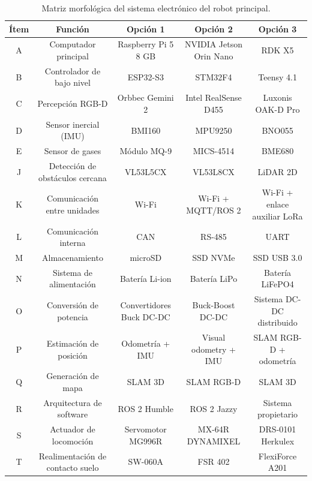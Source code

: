 \begin{table}[htbp]
\centering
\small
\renewcommand{\arraystretch}{1.3} %
\setlength{\tabcolsep}{5pt}       %

\begin{tabularx}{\textwidth}{|c|C|C|C|C|}
\hline
\textbf{Ítem} & \textbf{Función} & \textbf{Opción 1} & \textbf{Opción 2} & \textbf{Opción 3} \\
\hline
A & Computador principal & Raspberry Pi 5 8 GB & NVIDIA Jetson Orin Nano & RDK X5 \\
\hline
B & Controlador de bajo nivel & ESP32-S3 & STM32F4 & Teensy 4.1 \\
\hline
C & Percepción RGB-D & Orbbec Gemini 2 & Intel RealSense D455 & Luxonis OAK-D Pro \\
\hline
D & Sensor inercial (IMU) & BMI160 & MPU9250 & BNO055 \\
\hline
E & Sensor de gases & Módulo MQ-9 & MICS-4514 & BME680 \\
\hline
J & Detección de obstáculos cercana & VL53L5CX & VL53L8CX & LiDAR 2D \\
\hline
K & Comunicación entre unidades & Wi-Fi & Wi-Fi + MQTT/ROS 2 & Wi-Fi + enlace auxiliar LoRa \\
\hline
L & Comunicación interna & CAN & RS-485 & UART \\
\hline
M & Almacenamiento & microSD & SSD NVMe & SSD USB 3.0 \\
\hline
N & Sistema de alimentación & Batería Li-ion & Batería LiPo & Batería LiFePO4 \\
\hline
O & Conversión de potencia & Convertidores Buck DC-DC & Buck-Boost DC-DC & Sistema DC-DC distribuido \\
\hline
P & Estimación de posición & Odometría + IMU & Visual odometry + IMU & SLAM RGB-D + odometría \\
\hline
Q & Generación de mapa & SLAM 3D & SLAM RGB-D & SLAM 3D \\
\hline
R & Arquitectura de software & ROS 2 Humble & ROS 2 Jazzy & Sistema propietario \\
\hline
S & Actuador de locomoción & Servomotor MG996R & MX-64R DYNAMIXEL & DRS-0101 Herkulex \\
\hline
T & Realimentación de contacto suelo & SW-060A & FSR 402 & FlexiForce A201 \\
\hline
\end{tabularx}
\caption{Matriz morfológica del sistema electrónico del robot principal.}
\label{tab:matriz_morfologica_principal}
\end{table}

